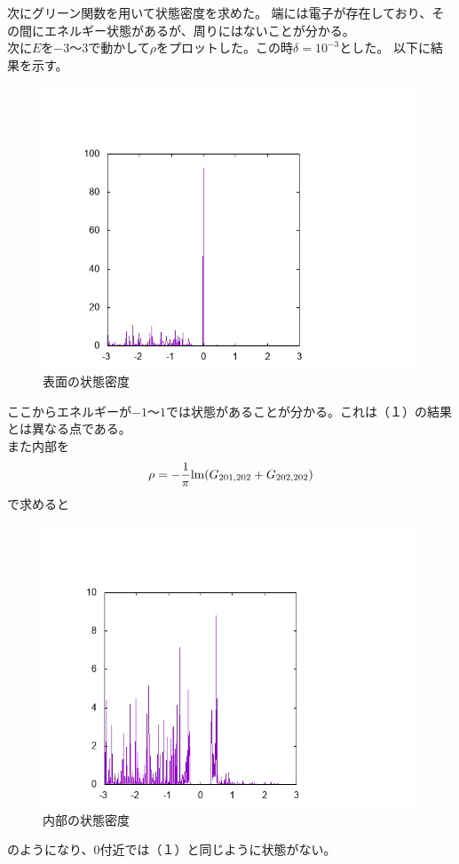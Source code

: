 \documentclass{jarticle}
\begin{document}
次にグリーン関数を用いて状態密度を求めた。
端には電子が存在しており、その間にエネルギー状態があるが、周りにはないことが分かる。\\
次に$E$を$-3$〜$3$で動かして$\rho$をプロットした。この時$\delta=10^{-3}$とした。
以下に結果を示す。
\begin{figure}[H]
	\centering
	\includegraphics[scale=0.5]{../../18/KS/18-3/graph/data.png}
	\caption{表面の状態密度}
\end{figure}
ここからエネルギーが$-1$〜$1$では状態があることが分かる。これは（１）の結果とは異なる点である。\\
また内部を
\begin{align}
\rho=-\dfrac{1}{\pi}{\rm lm}(G_{201,202}+G_{202,202})			
\end{align}
で求めると
\begin{figure}[H]
	\centering
	\includegraphics[scale=0.5]{../../18/KS/18-4/graph/data.png}
	\caption{内部の状態密度}
\end{figure}
のようになり、$0$付近では（１）と同じように状態がない。
\end{document}
